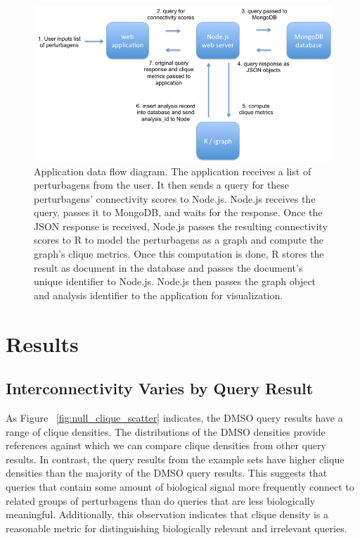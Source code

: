 \documentclass[12pt]{article}
\begin{document}
\begin{figure}[h]
\centering
\includegraphics[scale=0.5]{img/app_data_flow_small.png}
\caption{ Application data flow diagram. The application receives a list of perturbagens from the user. It then sends a query for these perturbagens' connectivity scores to Node.js. Node.js receives the query, passes it to MongoDB, and waits for the response. Once the JSON response is received, Node.js passes the resulting connectivity scores to R to model the perturbagens as a graph and compute the graph's clique metrics. Once this computation is done, R stores the result as document in the database and passes the document's unique identifier to Node.js. Node.js then passes the graph object and analysis identifier to the application for visualization.}
\label{fig:app_data_flow}
\end{figure}


\section{Results}

\subsection{Interconnectivity Varies by Query Result}
As Figure ~\ref{fig:null_clique_scatter} indicates, the DMSO query results have a range of clique densities. The distributions of the DMSO densities provide references against which we can compare clique densities from other query results. In contrast, the query results from the example sets have higher clique densities than the majority of the DMSO query results. This suggests that queries that contain some amount of biological signal more frequently connect to related groups of perturbagens than do queries that are less biologically meaningful. Additionally, this observation indicates that clique density is a reasonable metric for distinguishing biologically relevant and irrelevant queries.
\end{document}
